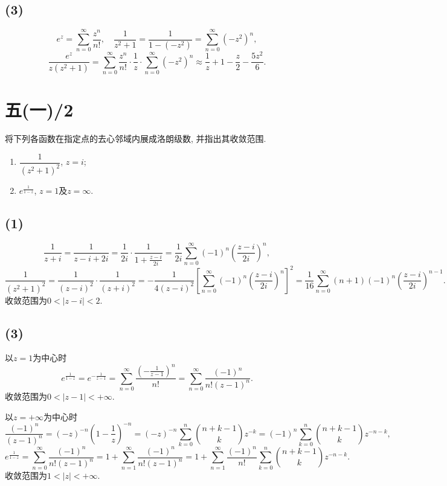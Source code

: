 \documentclass[11pt,a4paper]{article}
\begin{document}
\subsection*{(3)}
$$e^z=\sum_{n=0}^\infty\frac{z^n}{n!},\quad \frac{1}{z^2+1}=\frac{1}{1-(-z^2)}=\sum_{n=0}^\infty (-z^2)^n, $$
$$\frac{e^z}{z(z^2+1)}=\sum_{n=0}^\infty\frac{z^n}{n!}\cdot\frac{1}{z}\cdot\sum_{n=0}^\infty (-z^2)^n\approx\frac{1}{z}+1-\frac{z}{2}-\frac{5z^2}{6}.$$

\section{五(一)/2}
\begin{problem}
将下列各函数在指定点的去心邻域内展成洛朗级数, 并指出其收敛范围.
\begin{enumerate}
  \item $\dfrac{1}{(z^2+1)^2}$, $z=i$;
        \addtocounter{enumi}{1}
  \item $e^{\frac{1}{1-z}}$, $z=1$及$z=\infty$.
\end{enumerate}
\end{problem}


\subsection*{(1)}
$$\frac{1}{z+i}=\frac{1}{z-i+2i}=\frac{1}{2i}\cdot\frac{1}{1+\frac{z-i}{2i}}=\frac{1}{2i}\sum_{n=0}^\infty(-1)^n\left(\frac{z-i}{2i}\right)^n,$$
$$\frac{1}{(z^2+1)^2}=\frac{1}{(z-i)^2}\cdot\frac{1}{(z+i)^2}=-\frac{1}{4(z-i)^2}\left[\sum_{n=0}^\infty(-1)^n\left(\frac{z-i}{2i}\right)^n\right]^2=\frac{1}{16}\sum_{n=0}^\infty(n+1)(-1)^n\left(\frac{z-i}{2i}\right)^{n-1}.$$
收敛范围为$0<|z-i|<2$.

\subsection*{(3)}
以$z=1$为中心时
$$e^{\frac{1}{1-z}}=e^{-\frac{1}{z-1}}=\sum_{n=0}^\infty\frac{\left(-\frac{1}{z-1}\right)^n}{n!}=\sum_{n=0}^\infty\frac{(-1)^n}{n!(z-1)^n}.$$
收敛范围为$0<|z-1|<+\infty$.

以$z=+\infty$为中心时
$$\frac{(-1)^n}{(z-1)^n}=(-z)^{-n}\left(1-\frac{1}{z}\right)^{-n}=(-z)^{-n}\sum_{k=0}^n\binom{n+k-1}{k}z^{-k}=(-1)^n\sum_{k=0}^n\binom{n+k-1}{k}z^{-n-k},$$
$$e^{\frac{1}{1-z}}=\sum_{n=0}^\infty\frac{(-1)^n}{n!(z-1)^n}=1+\sum_{n=1}^\infty\frac{(-1)^n}{n!(z-1)^n}=1+\sum_{n=1}^\infty\frac{(-1)^n}{n!}\sum_{k=0}^n\binom{n+k-1}{k}z^{-n-k}.$$
收敛范围为$1<|z|<+\infty$.
\end{document}
